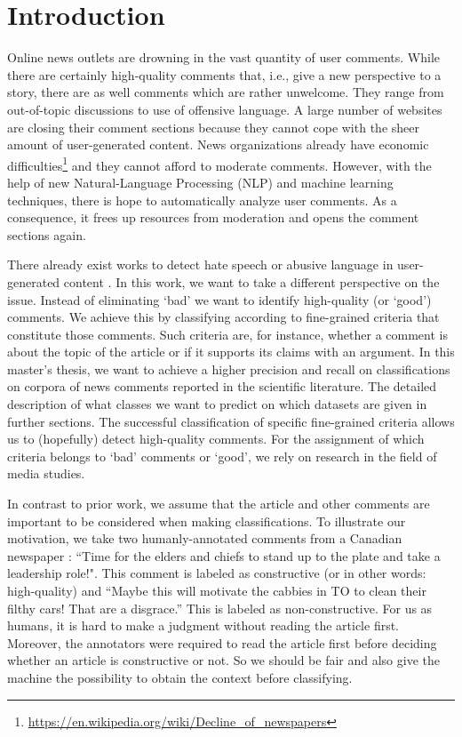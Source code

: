 \section{Introduction}


Online news outlets are drowning in the vast quantity of user comments. While there are certainly high-quality comments that, i.e., give a new perspective to a story, there are as well comments which are rather unwelcome. They range from out-of-topic discussions to use of offensive language. A large number of websites are closing their comment sections because they cannot cope with the sheer amount of user-generated content. News organizations already have economic difficulties\footnote{\url{https://en.wikipedia.org/wiki/Decline_of_newspapers}} and they cannot afford to moderate comments. However, with the help of new Natural-Language Processing (NLP) and machine learning techniques, there is hope to automatically analyze user comments. As a consequence, it frees up resources from moderation and opens the comment sections again. 

There already exist works to detect hate speech or abusive language in user-generated content \cite{hateoffensive, risch_delete_nodate, Nobata:2016:ALD:2872427.2883062, schmidt2017survey}. In this work, we want to take a different perspective on the issue. Instead of eliminating `bad' we want to identify high-quality (or `good') comments. We achieve this by classifying according to fine-grained criteria that constitute those comments. Such criteria are, for instance, whether a comment is about the topic of the article or if it supports its claims with an argument. In this master's thesis, we want to achieve a higher precision and recall on classifications on corpora of news comments reported in the scientific literature. The detailed description of what classes we want to predict on which datasets are given in further sections. The successful classification of specific fine-grained criteria allows us to (hopefully) detect high-quality comments. For the assignment of which criteria belongs to `bad' comments or `good', we rely on research in the field of media studies.

In contrast to prior work, we assume that the article and other comments are important to be considered when making classifications. To illustrate our motivation, we take two humanly-annotated comments from a Canadian newspaper \cite{kolhatkar2018sfu}: ``Time for the elders and chiefs to stand up to the plate and take a leadership role!". This comment is labeled as constructive (or in other words: high-quality) and ``Maybe this will motivate the cabbies in TO to clean their filthy cars! That are a disgrace.'' This is labeled as non-constructive. For us as humans, it is hard to make a judgment without reading the article first. Moreover, the annotators were required to read the article first before deciding whether an article is constructive or not. So we should be fair and also give the machine the possibility to obtain the context before classifying.

